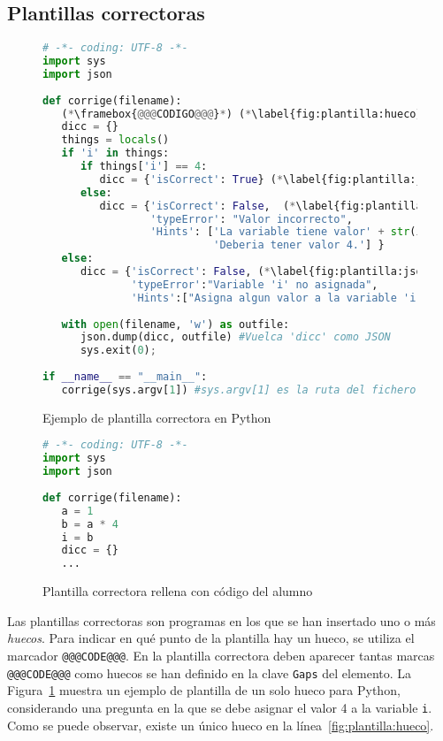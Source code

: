 \documentclass[]{article}
\newcommand{\code}[1]{{\lstinline[basicstyle=\ttfamily,mathescape]!#1!}}
\begin{document}
\subsection{Plantillas correctoras}\label{sec:plantillas}
\begin{figure}[tb]
\begin{lstlisting}[language=Python,basicstyle=\ttfamily, otherkeywords={with}]
# -*- coding: UTF-8 -*-
import sys
import json
	
def corrige(filename):
   (*\framebox{@@@CODIGO@@@}*) (*\label{fig:plantilla:hueco}*)
   dicc = {}
   things = locals()
   if 'i' in things:
      if things['i'] == 4:
         dicc = {'isCorrect': True} (*\label{fig:plantilla:json1}*)
      else:
         dicc = {'isCorrect': False,  (*\label{fig:plantilla:json2}*)
                 'typeError': "Valor incorrecto", 
                 'Hints': ['La variable tiene valor' + str(i),
                           'Deberia tener valor 4.'] }
   else:
      dicc = {'isCorrect': False, (*\label{fig:plantilla:json3}*)
              'typeError':"Variable 'i' no asignada", 
              'Hints':["Asigna algun valor a la variable 'i'"]}
	
   with open(filename, 'w') as outfile:
      json.dump(dicc, outfile) #Vuelca 'dicc' como JSON
      sys.exit(0);    
	
if __name__ == "__main__":
   corrige(sys.argv[1]) #sys.argv[1] es la ruta del fichero JSON
\end{lstlisting}	
\caption{Ejemplo de plantilla correctora en Python\label{fig:plantilla}}
\end{figure}

\begin{figure}[tb]
\begin{lstlisting}[language=Python,basicstyle=\ttfamily, otherkeywords={with}]
# -*- coding: UTF-8 -*-
import sys
import json
	
def corrige(filename):
   a = 1
   b = a * 4
   i = b
   dicc = {}
   ...
\end{lstlisting}	
\caption{Plantilla correctora rellena con código del alumno\label{fig:plantillaRellena}}
\end{figure}

Las plantillas correctoras son programas en los que se han insertado uno o más \emph{huecos}. Para indicar en qué punto de la plantilla hay un hueco, se utiliza el marcador \code{@@@CODE@@@}. En la plantilla correctora deben aparecer tantas marcas \code{@@@CODE@@@} como huecos se han definido en la clave \code{Gaps} del elemento. La Figura~\ref{fig:plantilla} muestra un ejemplo de plantilla de un solo hueco para Python, considerando una pregunta en la que se debe asignar el valor 4 a la variable \code{i}. Como se puede observar, existe un único hueco en la línea~\ref{fig:plantilla:hueco}.
\end{document}
